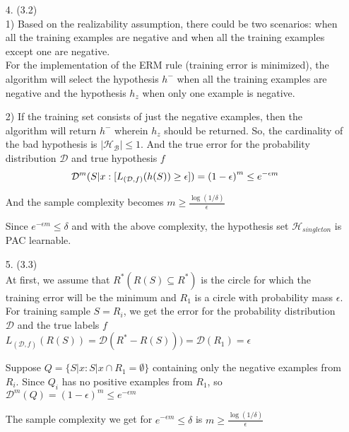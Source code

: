 \documentclass[12pt,letterpaper]{article}
\begin{document}
\begin{enumerate}
\vspace{4pt}


\item[4.] (3.2)\\
1){\noindent} Based on the realizability assumption, there could be two scenarios: when all the training examples are negative and when all the training examples except one are negative. \\
For the implementation of the ERM rule (training error is minimized), the algorithm will select the hypothesis $h^-$ when all the training examples are negative and the hypothesis $h_z$ when only one example is negative.

\vspace{4pt}

2) If the training set consists of just the negative examples, then the algorithm will return $h^-$ wherein $h_z$ should be returned. So, the cardinality of the bad hypothesis is $|\mathcal{H}_\mathcal{B}| \leq 1$. And the true error for the probability distribution $\mathcal{D}$ and true hypothesis $f$
\begin{equation*}
    \mathcal{D}^m({S|x: [L_{(\mathcal{D}, f)}(h(S)) \ge \epsilon]}) \\
    = {(1 - \epsilon)}^m \leq e^{-\epsilon m}
\end{equation*}

And the sample complexity becomes $m \ge \frac{\log(1/\delta)}{\epsilon}$

Since $e^{-\epsilon m} \leq \delta$ and with the above complexity, the hypothesis set $\mathcal{H}_{singleton}$ is PAC learnable.

\newpage


\item[5.] (3.3)\\
At first, we assume that $R^*(R(S) \subseteq R^*)$ is the circle for which the training error will be the minimum and $R_1$ is a circle with probability mass $\epsilon$. For training sample $S = R_i$, we get the error for the probability distribution $\mathcal{D}$ and the true labels $f$
$L_{(\mathcal{D}, f)}(R(S)) = \mathcal{D}(R^* - R(S))) = \mathcal{D}(R_1) = \epsilon$

Suppose $Q = \{S|x: S|x \cap R_1 = \emptyset\}$ containing only the negative examples from $R_i$. Since $Q_i$ has no positive examples from $R_1$, so
$\mathcal{D}^m(Q) = (1 - \epsilon)^m \leq e^{-\epsilon m}$

The sample complexity we get for $e^{-\epsilon m} \leq \delta$ is  $m \ge \frac{\log(1/\delta)}{\epsilon}$


\end{enumerate}
\end{document}
